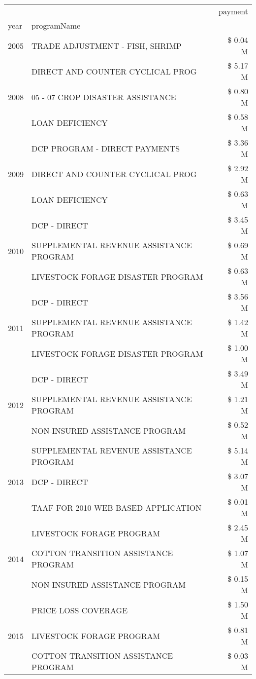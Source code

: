 \begin{tabular}{llr}
\toprule
 &  & payment \\
year & programName &  \\
\midrule
2005 & TRADE ADJUSTMENT - FISH, SHRIMP & \$ 0.04 M \\
\cline{1-3}
\multirow[t]{3}{*}{2008} & DIRECT AND COUNTER CYCLICAL PROG & \$ 5.17 M \\
 & 05 - 07 CROP DISASTER ASSISTANCE & \$ 0.80 M \\
 & LOAN DEFICIENCY & \$ 0.58 M \\
\cline{1-3}
\multirow[t]{3}{*}{2009} & DCP PROGRAM - DIRECT PAYMENTS & \$ 3.36 M \\
 & DIRECT AND COUNTER CYCLICAL PROG & \$ 2.92 M \\
 & LOAN DEFICIENCY & \$ 0.63 M \\
\cline{1-3}
\multirow[t]{3}{*}{2010} & DCP - DIRECT & \$ 3.45 M \\
 & SUPPLEMENTAL REVENUE ASSISTANCE PROGRAM & \$ 0.69 M \\
 & LIVESTOCK FORAGE DISASTER PROGRAM & \$ 0.63 M \\
\cline{1-3}
\multirow[t]{3}{*}{2011} & DCP - DIRECT & \$ 3.56 M \\
 & SUPPLEMENTAL REVENUE ASSISTANCE PROGRAM & \$ 1.42 M \\
 & LIVESTOCK FORAGE DISASTER PROGRAM & \$ 1.00 M \\
\cline{1-3}
\multirow[t]{3}{*}{2012} & DCP - DIRECT & \$ 3.49 M \\
 & SUPPLEMENTAL REVENUE ASSISTANCE PROGRAM & \$ 1.21 M \\
 & NON-INSURED ASSISTANCE PROGRAM & \$ 0.52 M \\
\cline{1-3}
\multirow[t]{3}{*}{2013} & SUPPLEMENTAL REVENUE ASSISTANCE PROGRAM & \$ 5.14 M \\
 & DCP - DIRECT & \$ 3.07 M \\
 & TAAF FOR 2010 WEB BASED APPLICATION & \$ 0.01 M \\
\cline{1-3}
\multirow[t]{3}{*}{2014} & LIVESTOCK FORAGE PROGRAM & \$ 2.45 M \\
 & COTTON TRANSITION ASSISTANCE PROGRAM & \$ 1.07 M \\
 & NON-INSURED ASSISTANCE PROGRAM & \$ 0.15 M \\
\cline{1-3}
\multirow[t]{3}{*}{2015} & PRICE LOSS COVERAGE & \$ 1.50 M \\
 & LIVESTOCK FORAGE PROGRAM & \$ 0.81 M \\
 & COTTON TRANSITION ASSISTANCE PROGRAM & \$ 0.03 M \\

\end{tabular}
